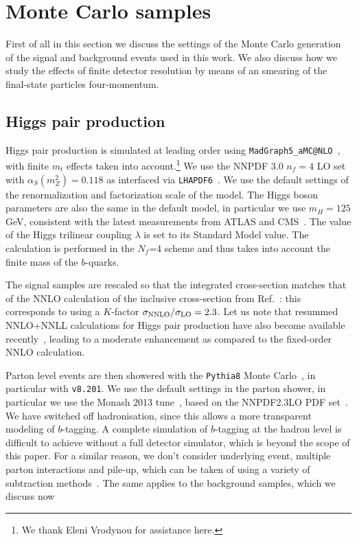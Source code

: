 \section{Monte Carlo samples}
\label{mcgeneration}

First of all in this section we discuss the settings of the
Monte Carlo generation of the signal and background
events used in this work.
%
We also discuss how we study the effects of finite detector
resolution by means of an smearing of the final-state
particles four-momentum.

\subsection{Higgs pair production}

Higgs pair production is simulated at leading order using
{\tt MadGraph5\_aMC@NLO}~\cite{Alwall:2014hca}, with finite $m_t$ effects taken into
account.\footnote{We thank Eleni Vrodynou for assistance here.}
%
We use the NNPDF 3.0 $n_f = 4$ LO set~\cite{Ball:2014uwa} with
$\alpha_S(m_Z^2)=0.118$
as interfaced via {\tt LHAPDF6}~\cite{Buckley:2014ana}.
%
We use the default settings of the renormalization and factorization
scale of the model.
%
The Higgs boson parameters are also the same in the default model,
in particular we use $m_H=125$ GeV, consistent with the latest
measurements from ATLAS and CMS~\cite{Aad:2014aba,Khachatryan:2014jba}.
%
The value of the Higgs trilinear coupling $\lambda$ is set to its
Standard Model value.
%
The calculation is performed in the
$N_f$=4 scheme and thus
takes into account the finite mass of the $b$-quarks.

The signal samples are rescaled so that the integrated cross-section matches that of the
NNLO calculation of the inclusive cross-section from Ref.~\cite{deFlorian:2013jea}:
this corresponds to using a $K$-factor $\sigma_{\rm NNLO}/\sigma_{\rm LO}=2.3$.
%
Let us note that resummed NNLO+NNLL calculations for Higgs pair production have also become available recently~\cite{deFlorian:2015moa},
leading to a moderate enhancement as compared to the fixed-order NNLO calculation.


%
Parton level events are then showered with the {\tt Pythia8} Monte
Carlo~\cite{Sjostrand:2007gs,Sjostrand:2014zea}, in particular with {\tt v8.201}.
%
We use the default settings in the parton shower, in particular
we use the Monash 2013 tune~\cite{Skands:2014pea}, based on the NNPDF2.3LO PDF set~\cite{Ball:2012cx}.
%
We have switched off hadronisation, since this allows a more transparent modeling of
$b$-tagging.
%
A complete simulation of $b$-tagging at the hadron level is difficult to achieve without a full
detector simulator, which is beyond the scope of this paper.
%
For a similar reason, we don't consider underlying event, multiple parton interactions and
pile-up, which can be taken of using a variety of subtraction methods~\cite{Cacciari:2009dp}.
%
The same applies to the background samples, which we discuss now

